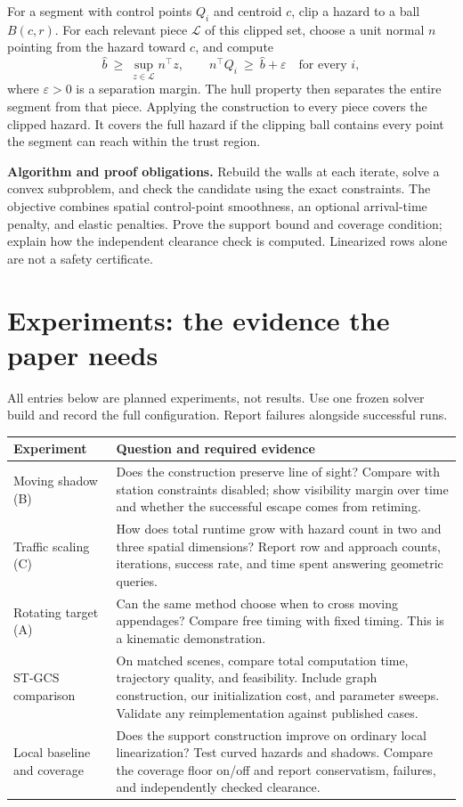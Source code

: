 \documentclass[11pt]{article}
\begin{document}
For a segment with control points $Q_i$ and centroid $c$, clip a hazard to a
ball $B(c,r)$. For each relevant piece $\mathcal L$ of this clipped set, choose
a unit normal $n$ pointing from the hazard toward $c$, and compute
\[
 \widehat b\ \ge\ \sup_{z\in\mathcal L}n^\top z,
 \qquad n^\top Q_i\ \ge\ \widehat b+\varepsilon\quad\text{for every }i,
\]
where $\varepsilon>0$ is a separation margin. The hull property then separates
the entire segment from that piece. Applying the construction to every piece
covers the clipped hazard. It covers the full hazard if the clipping ball
contains every point the segment can reach within the trust region.

\textbf{Algorithm and proof obligations.} Rebuild the walls at each iterate,
solve a convex subproblem, and check the candidate using the exact constraints.
The objective combines spatial control-point smoothness, an optional arrival-time
penalty, and elastic penalties. Prove the support bound and coverage condition;
explain how the independent clearance check is computed. Linearized rows alone
are not a safety certificate.

\newpage
\section{Experiments: the evidence the paper needs}
All entries below are planned experiments, not results. Use one frozen solver
build and record the full configuration. Report failures alongside successful runs.

\renewcommand{\arraystretch}{1.18}
\begin{tabularx}{\linewidth}{@{}>{\raggedright\arraybackslash}p{32mm}X@{}}
\toprule
Experiment & Question and required evidence \\
\midrule
Moving shadow (B) & Does the construction preserve line of sight? Compare with
station constraints disabled; show visibility margin over time and whether the
successful escape comes from retiming. \\
Traffic scaling (C) & How does total runtime grow with hazard count in two and
three spatial dimensions? Report row and approach counts, iterations, success
rate, and time spent answering geometric queries. \\
Rotating target (A) & Can the same method choose when to cross moving appendages?
Compare free timing with fixed timing. This is a kinematic demonstration. \\
ST-GCS comparison & On matched scenes, compare total computation time, trajectory
quality, and feasibility. Include graph construction, our initialization cost,
and parameter sweeps. Validate any reimplementation against published cases. \\
Local baseline and coverage & Does the support construction improve on ordinary
local linearization? Test curved hazards and shadows. Compare the coverage floor
on/off and report conservatism, failures, and independently checked clearance. \\
\bottomrule
\end{tabularx}
\end{document}
